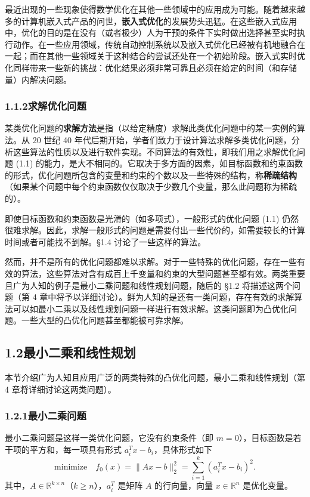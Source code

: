 \documentclass[UTF8,12pt,a4paper,fontset=fandol]{ctexart}
\begin{document}
最近出现的一些现象使得数学优化在其他一些领域中的应用成为可能。随着越来越多的计算机嵌入式产品的问世，\textbf{嵌入式优化}的发展势头迅猛。在这些嵌入式应用中，优化的目的是在没有（或者极少）人为干预的条件下实时做出选择甚至实时执行动作。在一些应用领域，传统自动控制系统以及嵌入式优化已经被有机地融合在一起；而在其他一些领域关于这种结合的尝试还处在一个初始阶段。嵌入式实时优化同样带来一些新的挑战：优化结果必须非常可靠且必须在给定的时间（和存储量）内解决问题。

\subsubsection*{1.1.2\quad 求解优化问题}

某类优化问题的\textbf{求解方法}是指（以给定精度）求解此类优化问题中的某一实例的算法。从 20 世纪 40 年代后期开始，学者们致力于设计算法求解多类优化问题，分析这些算法的性质以及进行软件实现。不同算法的有效性，即我们用之求解优化问题 (1.1) 的能力，是大不相同的。它取决于多方面的因素，如目标函数和约束函数的形式，优化问题所包含的变量和约束的个数以及一些特殊的结构，称\textbf{稀疏结构}（如果某个问题中每个约束函数仅仅取决于少数几个变量，那么此问题称为稀疏的）。

即使目标函数和约束函数是光滑的（如多项式），一般形式的优化问题 (1.1) 仍然很难求解。因此，求解一般形式的问题是需要付出一些代价的，如需要较长的计算时间或者可能找不到解。§1.4 讨论了一些这样的算法。

然而，并不是所有的优化问题都难以求解。对于一些特殊的优化问题，存在一些有效的算法，这些算法对含有成百上千变量和约束的大型问题甚至都有效。两类重要且广为人知的例子是最小二乘问题和线性规划问题，随后的 §1.2 将描述这两个问题（第 4 章中将予以详细讨论）。鲜为人知的是还有一类问题，存在有效的求解算法可以如最小二乘以及线性规划问题一样进行有效求解。这类问题即为凸优化问题。一些大型的凸优化问题甚至都能被可靠求解。

\subsection*{1.2\quad 最小二乘和线性规划}

本节介绍广为人知且应用广泛的两类特殊的凸优化问题，最小二乘和线性规划（第 4 章将详细讨论这两类问题）。

\subsubsection*{1.2.1\quad 最小二乘问题}

最小二乘问题是这样一类优化问题，它没有约束条件（即 $m=0$），目标函数是若干项的平方和，每一项具有形式 $a_i^Tx-b_i$，具体形式如下
\begin{equation}
  \text{minimize}\quad f_0(x)=\|Ax-b\|_2^2=\sum_{i=1}^k (a_i^Tx-b_i)^2.
\tag{1.4}
\end{equation}
其中，$A\in\mathbb{R}^{k\times n}$（$k\ge n$），$a_i^T$ 是矩阵 $A$ 的行向量，向量 $x\in\mathbb{R}^n$ 是优化变量。
\end{document}
